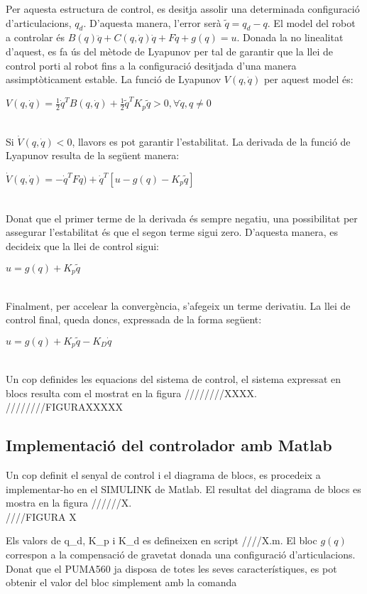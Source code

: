 \documentclass[]{article}
\begin{document}
Per aquesta estructura de control, es desitja assolir una determinada configuració d'articulacions, $q_{d}$. D'aquesta manera, l'error serà $\tilde{q} = q_{d} - q$. El model del robot a controlar és $B(q)\ddot{q} + C(q, \dot{q})\dot{q} + F\dot{q} + g(q) = u$. Donada la no linealitat d'aquest, es fa ús del mètode de Lyapunov per tal de garantir que la llei de control porti al robot fins a la configuració desitjada d'una manera assimptòticament estable. La funció de Lyapunov $V(q, \dot{q})$ per aquest model és: \\

\centerline{$V(q, \dot{q}) = \frac{1}{2}\dot{q}^TB(q,\dot{q}) +  \frac{1}{2}\tilde{q}^TK_{p}\tilde{q} > 0 , \forall\dot{q},q \neq 0$ } \leavevmode \\

Si $\dot{V}(q, \dot{q}) < 0$, llavors es pot garantir l'estabilitat. La derivada de la funció de Lyapunov resulta de la següent manera: \\

\centerline{$\dot{V}(q, \dot{q})= -\dot{q}^TF\dot{q}) + \dot{q}^T[u - g(q) - K_{p}\tilde{q}]$} \leavevmode \\

Donat que el primer terme de la derivada és sempre negatiu, una possibilitat per assegurar l'estabilitat és que el segon terme sigui zero. D'aquesta manera, es decideix que la llei de control sigui: \\

\centerline{$u = g(q) + K_{p}\tilde{q}$} \leavevmode \\

Finalment, per accelear la convergència, s'afegeix un terme derivatiu. La llei de control final, queda doncs, expressada de la forma següent: \\

\centerline{$u = g(q) + K_{p}\tilde{q} -K_{D}\dot{q}$} \leavevmode \\

Un cop definides les equacions del sistema de control, el sistema expressat en blocs resulta com el mostrat en la figura ////////XXXX. \\

////////FIGURAXXXXX 

\subsection{Implementació del controlador amb Matlab}

Un cop definit el senyal de control i el diagrama de blocs, es procedeix a implementar-ho en el SIMULINK de Matlab. El resultat del diagrama de blocs es mostra en la figura //////X. \\

////FIGURA X

Els valors de q_{d}, K_{p} i K_{d} es defineixen en script ////X.m. El bloc $g(q)$ correspon a la compensació de gravetat donada una configuració d'articulacions. Donat que el PUMA560 ja disposa de totes les seves característiques, es pot obtenir el valor del bloc simplement amb la comanda
\end{document}
